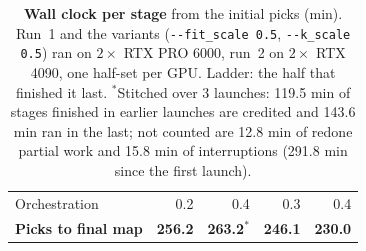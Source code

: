\begin{table}[!htb]
\begin{tabular}{@{}lrrrr@{}}
\midrule
Orchestration & 0.2 & 0.4 & 0.3 & 0.4 \\
\textbf{Picks to final map} & \textbf{256.2} & \textbf{263.2}$^\ast$ & \textbf{246.1} & \textbf{230.0} \\
\bottomrule
\end{tabular}
\caption{\textbf{Wall clock per stage} from the initial picks (min). Run~1 and the variants (\texttt{-{}-fit\_scale 0.5}, \texttt{-{}-k\_scale 0.5}) ran on $2\times$ RTX PRO 6000, run~2 on $2\times$ RTX 4090, one half-set per GPU. Ladder: the half that finished it last.
$^\ast$Stitched over 3 launches: 119.5 min of stages finished in earlier launches are credited and 143.6 min ran in the last; not counted are 12.8 min of redone partial work and 15.8 min of interruptions (291.8 min since the first launch).}
\label{tab:suppl:stages}
\end{table}

